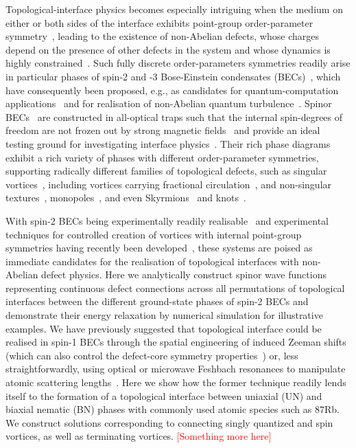 Topological-interface physics becomes especially intriguing when the medium on
either or both sides of the interface exhibits point-group order-parameter
symmetry~\cite{Xiao2022}, leading to the existence of non-Abelian defects,
whose charges depend on the presence of other defects in the system and whose
dynamics is highly constrained~\cite{Poenaru1977,Mermin1979,Kobayashi2009}.
Such fully discrete order-parameters symmetries readily arise in particular
phases of spin-2 and -3 Bose-Einstein condensates
(BECs)~\cite{Barnett2006,Barnett2007,Semenoff2007,Makela2007,Yip2007,
    Kobayashi2009,Borgh2016b,Xiao2022}, which have consequently been proposed, e.g.,
as candidates for quantum-computation applications~\cite{Mawson2019} and for
realisation of non-Abelian quantum turbulence~\cite{Mawson2015}.
Spinor BECs~\cite{Kawaguchi2012,StamperKurn2013} are constructed in all-optical
traps such that the internal spin-degrees of freedom are not frozen out by
strong magnetic fields~\cite{StamperKurn1998} and provide an ideal
testing ground for investigating interface
physics~\cite{Borgh2012,Borgh2013,Borgh2014}.
Their rich phase diagrams~\cite{Kawaguchi2012} exhibit a rich variety of
phases with different order-parameter symmetries, supporting radically different
families of topological defects, such as singular
vortices~\cite{Yip1999,Isoshima2002,
    Zhou2003,Ji2008,Takahashi2009,Lovegrove2012,Weiss2019,Xiao2021}, including
vortices carrying fractional circulation~\cite{Leonhardt2000,Ji2008,Seo2015,
    Semenoff2007,Borgh2016b,Xiao2022}, and non-singular
textures~\cite{MizushimaPRL2002, MizushimaPRA2002,
    Martikainen2002,Choi2012,Lovegrove2014},
monopoles~\cite{Pietila2009,Ollikainen2017,Ruostekoski2003,Ray2014,Ray2015,
    Mithun2022}, and even Skyrmions~\cite{Tiurev2018,Lee2018} and
knots~\cite{Hall2016}.

With spin-2 BECs being experimentally readily realisable~\cite{Schmaljohann2004}
and  experimental techniques for controlled creation of vortices with internal
point-group symmetries having recently been developed~\cite{Xiao2022}, these
systems are poised as immediate candidates for the realisation of topological
interfaces with non-Abelian defect physics. Here we analytically construct spinor
wave functions representing continuous defect connections across all
permutations of topological interfaces between the different ground-state
phases of spin-2 BECs and demonstrate their energy relaxation by numerical
simulation for illustrative examples. We have previously suggested that
topological interface could be realised in spin-1 BECs through the spatial
engineering of induced Zeeman shifts~\cite{Borgh2014} (which can also control
the defect-core symmetry properties~\cite{Borgh2016a,Underwood2020}) or, less
straightforwardly, using optical or microwave Feshbach resonances to manipulate
atomic scattering lengths~\cite{Borgh2012,Borgh2013}. Here we show how the
former technique readily lends itself to the formation of a topological
interface between uniaxial (UN) and biaxial nematic (BN) phases with commonly
used atomic species such as \({87}\)Rb. We construct solutions corresponding to
connecting singly quantized and spin vortices, as well as terminating vortices.
\textcolor{red}{[Something more here]}

